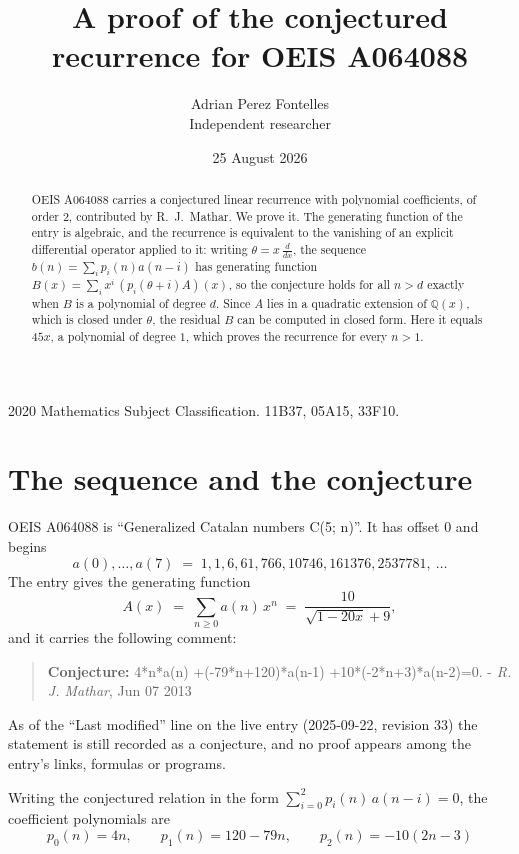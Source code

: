 \documentclass[11pt,a4paper]{article}
\title{A proof of the conjectured recurrence for OEIS A064088}
\author{Adrian Perez Fontelles\\ \small Independent researcher}
\date{25 August 2026}
\theoremstyle{plain}
\theoremstyle{definition}
\begin{document}
\maketitle

\begin{abstract}
OEIS A064088 carries a conjectured linear recurrence with polynomial coefficients, of
order 2, contributed by R.~J.~Mathar. We prove it. The generating function of the
entry is algebraic, and the recurrence is equivalent to the vanishing of an explicit
differential operator applied to it: writing $\theta=x\,\frac{d}{dx}$, the sequence
$b(n)=\sum_{i}p_{i}(n)a(n-i)$ has generating function
$B(x)=\sum_{i}x^{i}\,(p_{i}(\theta+i)A)(x)$, so the conjecture holds for all $n>d$ exactly
when $B$ is a polynomial of degree $d$. Since $A$ lies in a quadratic extension of
$\mathbb{Q}(x)$, which is closed under $\theta$, the residual $B$ can be computed in
closed form. Here it equals $45 x$, a polynomial of degree $1$, which proves
the recurrence for every $n>1$.
\end{abstract}

\noindent\small 2020 Mathematics Subject Classification. 11B37, 05A15, 33F10.\normalsize

\section{The sequence and the conjecture}

OEIS A064088 is ``Generalized Catalan numbers C(5; n)''. It has offset $0$ and begins
\[
a(0),\dots,a(7)\;=\;1, 1, 6, 61, 766, 10746, 161376, 2537781,\ \dots
\]
The entry gives the generating function
\begin{equation}\label{eq:gf}
A(x)\;=\;\sum_{n\ge 0} a(n)\,x^{n}\;=\;\frac{10}{\sqrt{1 - 20 x} + 9} ,
\end{equation}
and it carries the following comment:
\begin{quote}\small
\textbf{Conjecture:} 4*n*a(n) +(-79*n+120)*a(n-1) +10*(-2*n+3)*a(n-2)=0. - \emph{R. J. Mathar}, Jun 07 2013
\end{quote}
As of the ``Last modified'' line on the live entry (2025-09-22, revision 33) the
statement is still recorded as a conjecture, and no proof appears among the entry's links,
formulas or programs.

Writing the conjectured relation in the form $\sum_{i=0}^{2}p_{i}(n)\,a(n-i)=0$,
the coefficient polynomials are
\[
p_{0}(n)=4 n,\qquad p_{1}(n)=120 - 79 n,\qquad p_{2}(n)=- 10 \left(2 n - 3\right)
\]
\end{document}
